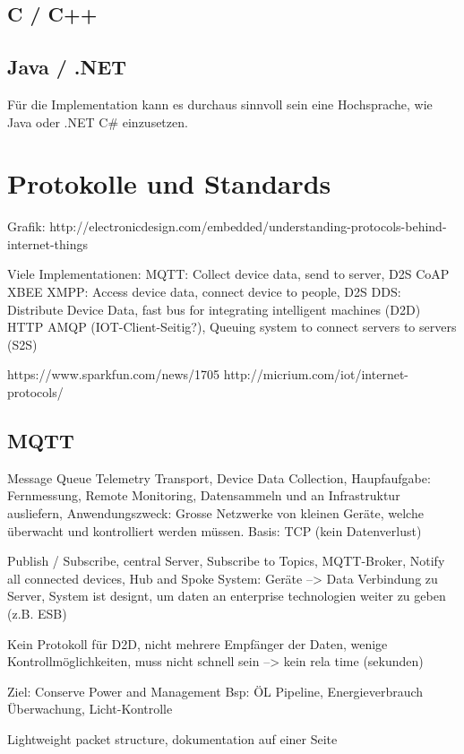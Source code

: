 \subsection{C / C++}


\subsection{Java / .NET}
Für die Implementation kann es durchaus sinnvoll sein eine Hochsprache, wie Java oder .NET C\# einzusetzen. 

\section{Protokolle und Standards}

Grafik: http://electronicdesign.com/embedded/understanding-protocols-behind-internet-things 

Viele Implementationen:
MQTT: Collect device data, send to server, D2S
CoAP
XBEE
XMPP: Access device data, connect device to people, D2S
DDS: Distribute Device Data, fast bus for integrating intelligent machines (D2D)
HTTP
AMQP (IOT-Client-Seitig?), Queuing system to connect servers to servers (S2S)

https://www.sparkfun.com/news/1705
http://micrium.com/iot/internet-protocols/

\subsection{MQTT}
Message Queue Telemetry Transport, Device Data Collection, Haupfaufgabe: Fernmessung, Remote Monitoring, Datensammeln und an Infrastruktur ausliefern, Anwendungszweck: Grosse Netzwerke von kleinen Geräte, welche überwacht und kontrolliert werden müssen. Basis: TCP (kein Datenverlust)

Publish / Subscribe, central Server, Subscribe to Topics, MQTT-Broker, Notify all connected devices, 
Hub and Spoke System: Geräte --> Data Verbindung zu Server, System ist designt, um daten an enterprise technologien weiter zu geben (z.B. ESB)

Kein Protokoll für D2D, nicht mehrere Empfänger der Daten, wenige Kontrollmöglichkeiten, muss nicht schnell sein --> kein rela time (sekunden)

Ziel: Conserve Power and Management
Bsp: ÖL Pipeline, Energieverbrauch Überwachung, Licht-Kontrolle

Lightweight packet structure, dokumentation auf einer Seite


